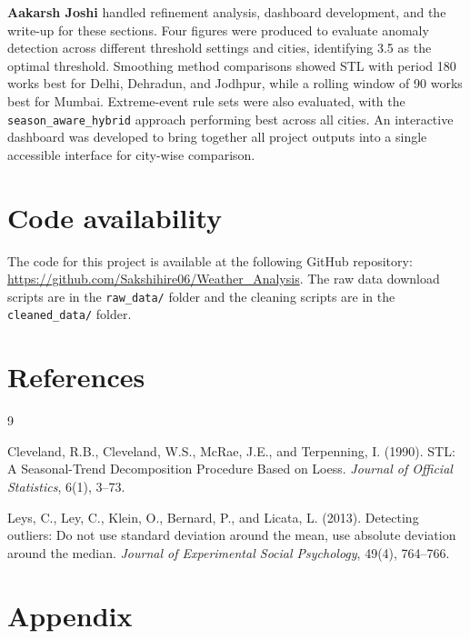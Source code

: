 \textbf{Aakarsh Joshi} handled refinement analysis, dashboard development, 
and the write-up for these sections. Four figures were produced to evaluate 
anomaly detection across different threshold settings and cities, identifying 
3.5 as the optimal threshold. Smoothing method comparisons showed STL with 
period 180 works best for Delhi, Dehradun, and Jodhpur, while a rolling 
window of 90 works best for Mumbai. Extreme-event rule sets were also 
evaluated, with the \texttt{season\_aware\_hybrid} approach performing best 
across all cities. An interactive dashboard was developed to bring together 
all project outputs into a single accessible interface for city-wise 
comparison.



\section{Code availability}
The code for this project is available at the following GitHub repository:
\url{https://github.com/Sakshihire06/Weather_Analysis}.
The raw data download scripts are in the \texttt{raw\_data/} folder and
the cleaning scripts are in the \texttt{cleaned\_data/} folder.

\section{References}

\begin{thebibliography}{9}

Cleveland, R.B., Cleveland, W.S., McRae, J.E., and Terpenning, I. (1990).
STL: A Seasonal-Trend Decomposition Procedure Based on Loess.
\textit{Journal of Official Statistics}, 6(1), 3--73.

Leys, C., Ley, C., Klein, O., Bernard, P., and Licata, L. (2013).
Detecting outliers: Do not use standard deviation around the mean,
use absolute deviation around the median.
\textit{Journal of Experimental Social Psychology}, 49(4), 764--766.

\end{thebibliography}


\section{Appendix}





